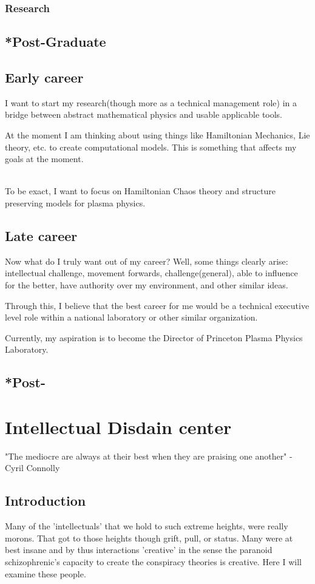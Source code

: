 \subsection{Research}
\section{*Post-Graduate}

\section{Early career}
\par I want to start my research(though more as a technical management role) in a bridge between abstract mathematical physics and usable applicable tools.
\par At the moment I am thinking about using things like Hamiltonian Mechanics, Lie theory, etc. to create computational models. This is something that affects my goals at the moment.
\\
\\
\par To be exact, I want to focus on Hamiltonian Chaos theory and structure preserving models for plasma physics.
\section{Late career}
\par Now what do I truly want out of my career? Well, some things clearly arise: intellectual challenge, movement forwards, challenge(general), able to influence for the better, have authority over my environment, and other similar ideas.
\par Through this, I believe that the best career for me would be a technical executive level role within a national laboratory or other similar organization.
\par Currently, my aspiration is to become the Director of Princeton Plasma Physics Laboratory.
\section{*Post-}
\chapter{Intellectual Disdain center}
"The mediocre are always at their best when they are praising one another" - Cyril Connolly
\section{Introduction}
\par Many of the 'intellectuals' that we hold to such extreme heights, were really morons. That got to those heights though grift, pull, or status. Many were at best insane and by thus interactions 'creative' in the sense the paranoid schizophrenic's capacity to create the conspiracy theories is creative. Here I will examine these people.
